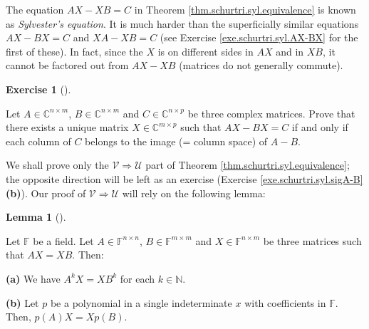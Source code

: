 \documentclass[numbers=enddot,12pt,final,onecolumn,notitlepage]{scrartcl}%
\newcounter{exer}
\numberwithin{exer}{subsection}
\theoremstyle{definition}
\newtheorem{lem}[theo]{Lemma}
\newenvironment{lemma}[1][]
{\begin{lem}[#1]\begin{leftbar}}
{\end{leftbar}\end{lem}}
\newtheorem{exmp}[exer]{Exercise}
\newenvironment{exercise}[1][]
{\begin{exmp}[#1]\begin{leftbar}}
{\end{leftbar}\end{exmp}}
\begin{document}
The equation $AX-XB=C$ in Theorem \ref{thm.schurtri.syl.equivalence} is known
as \emph{Sylvester's equation}. It is much harder than the superficially
similar equations $AX-BX=C$ and $XA-XB=C$ (see Exercise
\ref{exe.schurtri.syl.AX-BX} for the first of these). In fact, since the $X$
is on different sides in $AX$ and in $XB$, it cannot be factored out from
$AX-XB$ (matrices do not generally commute).

\begin{exercise}
\label{exe.schurtri.syl.AX-BX} Let $A\in\mathbb{C}^{n\times m}$,
$B\in\mathbb{C}^{n\times m}$ and $C\in\mathbb{C}^{n\times p}$ be three complex
matrices. Prove that there exists a unique matrix $X\in\mathbb{C}^{m\times p}$
such that $AX-BX=C$ if and only if each column of $C$ belongs to the image (=
column space) of $A-B$.
\end{exercise}

We shall prove only the $\mathcal{V}\Longrightarrow\mathcal{U}$ part of
Theorem \ref{thm.schurtri.syl.equivalence}; the opposite direction will be
left as an exercise (Exercise \ref{exe.schurtri.syl.sigA-B} \textbf{(b)}). Our
proof of $\mathcal{V}\Longrightarrow\mathcal{U}$ will rely on the following lemma:

\begin{lemma}
\label{lem.schurtri.syl.AX=XB}Let $\mathbb{F}$ be a field. Let $A\in
\mathbb{F}^{n\times n}$, $B\in\mathbb{F}^{m\times m}$ and $X\in\mathbb{F}%
^{n\times m}$ be three matrices such that $AX=XB$. Then: \medskip

\textbf{(a)} We have $A^{k}X=XB^{k}$ for each $k\in\mathbb{N}$. \medskip

\textbf{(b)} Let $p$ be a polynomial in a single indeterminate $x$ with
coefficients in $\mathbb{F}$. Then, $p\left(  A\right)  X=Xp\left(  B\right)
$.
\end{lemma}
\end{document}

